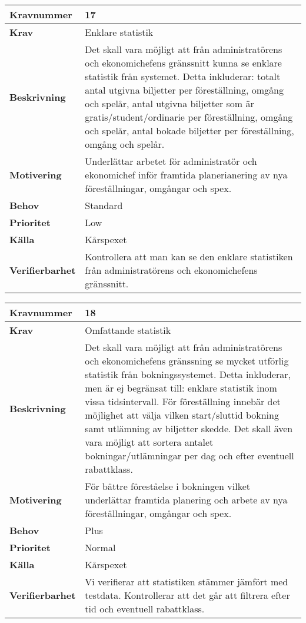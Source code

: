 \documentclass[a4paper, twoside, 11pt, titlepage]{article}
\begin{document}
\begin{tabular} { | p{3cm} | p{12.2cm} | }
	\hline
	\textbf{Kravnummer} & 17  \\
	\hline
	\textbf{Krav} & Enklare statistik   \\
	\hline
	\textbf{Beskrivning} & Det skall vara möjligt att från administratörens och ekonomichefens gränssnitt kunna se enklare statistik från systemet. Detta inkluderar: totalt antal utgivna biljetter per föreställning, omgång och spelår, antal utgivna biljetter som är gratis/student/ordinarie per föreställning, omgång och spelår, antal bokade biljetter per föreställning, omgång och spelår.   \\
	\hline
	\textbf{Motivering} & Underlättar arbetet för administratör och ekonomichef inför framtida planerianering av nya föreställningar, omgångar och spex.  \\
	\hline
	\textbf{Behov} & Standard  \\
	\hline
	\textbf{Prioritet} & Low  \\
	\hline
	\textbf{Källa} & Kårspexet  \\
	\hline
	\textbf{Verifierbarhet} & Kontrollera att man kan se den enklare statistiken från administratörens och ekonomichefens gränssnitt.  \\
	\hline
\end{tabular}

\begin{tabular} { | p{3cm} | p{12.2cm} | }
	\hline
	\textbf{Kravnummer} & 18  \\
	\hline
	\textbf{Krav} & Omfattande statistik  \\
	\hline
	\textbf{Beskrivning} & Det skall vara möjligt att från administratörens och ekonomichefens gränssning se mycket utförlig statistik från bokningssystemet. Detta inkluderar, men är ej begränsat till: enklare statistik inom vissa tidsintervall. För föreställning innebär det möjlighet att välja vilken start/sluttid bokning samt utlämning av biljetter skedde. Det skall även vara möjligt att sortera antalet bokningar/utlämningar per dag och efter eventuell rabattklass.  \\
	\hline
	\textbf{Motivering} & För bättre föreståelse i bokningen vilket underlättar framtida planering och arbete av nya föreställningar, omgångar och spex.  \\
	\hline
	\textbf{Behov} & Plus  \\
	\hline
	\textbf{Prioritet} & Normal  \\
	\hline
	\textbf{Källa} & Kårspexet  \\
	\hline
	\textbf{Verifierbarhet} & Vi verifierar att statistiken stämmer jämfört med testdata. Kontrollerar att det går att filtrera efter tid och eventuell rabattklass.  \\
	\hline
\end{tabular}
\end{document}
